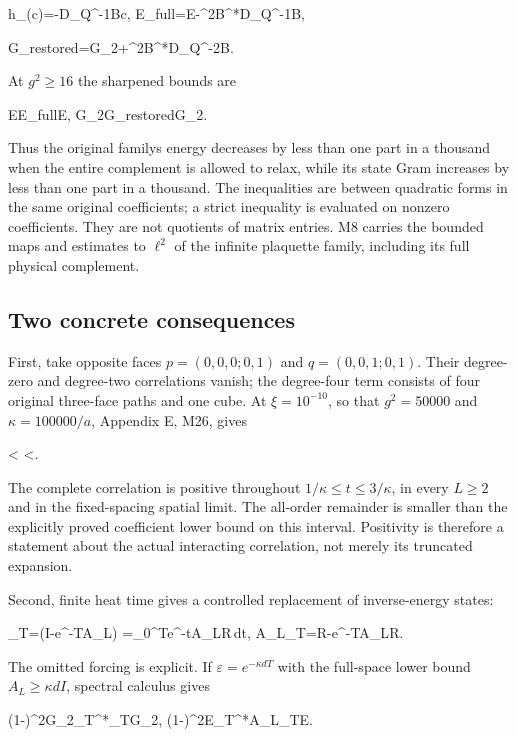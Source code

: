 \documentclass[11pt,a4paper]{article}
\renewcommand{\[}{\begingroup\small\originaldisplaystart}
\renewcommand{\]}{\originaldisplayend\endgroup}
\begin{document}
\[
h_{\min}(c)=-\kappa D_Q^{-1}Bc,\qquad
E_{\rm full}=E-\kappa^2B^*D_Q^{-1}B,
\]

\[
G_{\rm restored}=G_2+\kappa^2B^*D_Q^{-2}B.
\]

At \(g^2\geq16\) the sharpened bounds are

\[
E\prec E_{\rm full}\preceq E,
\qquad
G_2\preceq G_{\rm restored}\prec{}G_2.
\]

Thus the original family\textquotesingle s energy decreases by less than
one part in a thousand when the entire complement is allowed to relax,
while its state Gram increases by less than one part in a thousand. The
inequalities are between quadratic forms in the same original
coefficients; a strict inequality is evaluated on nonzero coefficients.
They are not quotients of matrix entries. M8 carries the bounded maps
and estimates to \(\ell^2\) of the infinite plaquette family, including
its full physical complement.

\subsection{Two concrete consequences}\label{two-concrete-consequences}

First, take opposite faces \(p=(0,0,0;0,1)\) and \(q=(0,0,1;0,1)\).
Their degree-zero and degree-two correlations vanish; the degree-four
term consists of four original three-face paths and one cube. At
\(\xi=10^{-10}\), so that \(g^2=50000\) and \(\kappa=100000/a\),
Appendix E, M26, gives

\[
<
<.
\]

The complete correlation is positive throughout
\(1/\kappa\leq t\leq3/\kappa\), in every \(L\geq2\) and in the
fixed-spacing spatial limit. The all-order remainder is smaller than the
explicitly proved coefficient lower bound on this interval. Positivity
is therefore a statement about the actual interacting correlation, not
merely its truncated expansion.

Second, finite heat time gives a controlled replacement of
inverse-energy states:

\[
\Phi_T=(I-e^{-TA_L})\Phi
=\kappa\int_0^Te^{-tA_L}R\,dt,\qquad
A_L\Phi_T=\kappa R-\kappa e^{-TA_L}R.
\]

The omitted forcing is explicit. If \(\varepsilon=e^{-\kappa dT}\) with
the full-space lower bound \(A_L\geq\kappa dI\), spectral calculus gives

\[
(1-\varepsilon)^2G_2\preceq\Phi_T^*\Phi_T\preceq G_2,
\qquad
(1-\varepsilon)^2E\preceq\Phi_T^*A_L\Phi_T\preceq E.
\]
\end{document}
